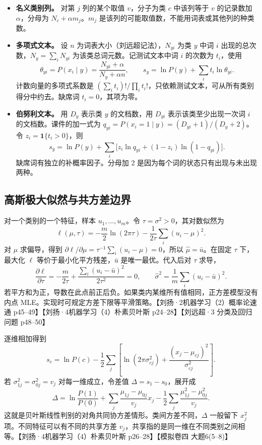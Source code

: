 \documentclass[UTF8,a4paper,zihao=-4,fontset=fandol]{ctexrep}
\begin{document}
\begin{itemize}
\item \textbf{名义类别列。} 对第 $j$ 列的某个取值 $v$，分子为类 $c$ 中该列等于 $v$ 的记录数加 $\alpha$，分母为 $N_c+\alpha m_j$。$m_j$ 是该列的可能取值数，不能用词表或其他列的种类数。
\item \textbf{多项式文本。} 设 $n$ 为词表大小（刘远超记法），$N_{yi}$ 为类 $y$ 中词 $i$ 出现的总次数，$N_y=\sum_iN_{yi}$ 为该类总词元数。记测试文本中词 $i$ 的次数为 $t_i$，使用
\[
 \theta_{yi}=P(x_i\mid y)=\frac{N_{yi}+\alpha}{N_y+\alpha n},
 \qquad
 s_y=\ln P(y)+\sum_i t_i\ln\theta_{yi}.
\]
计数向量的多项式系数是 $(\sum_it_i)!/\prod_i t_i!$，只依赖测试文本，可从所有类别得分中约去。缺席词 $t_i=0$，其项为零。
\item \textbf{伯努利文本。} 用 $D_y$ 表示类 $y$ 的文档数，用 $D_{yi}$ 表示该类至少出现一次词 $i$ 的文档数。课件的加一式为 $q_{yi}=P(x_i=1\mid y)=(D_{yi}+1)/(D_y+2)$。令 $z_i=\mathbf1\{t_i>0\}$，则
\[
 s_y=\ln P(y)+\sum_i\bigl[z_i\ln q_{yi}+(1-z_i)\ln(1-q_{yi})\bigr].
\]
缺席词有独立的补概率因子。分母加 2 是因为每个词的状态只有出现与未出现两种。
\end{itemize}

\subsection*{高斯极大似然与共方差边界}
对一个类别的一个特征，样本 $u_1,\ldots,u_m$。令 $\tau=\sigma^2>0$，其对数似然为
\[
 \ell(\mu,\tau)=-\frac m2\ln(2\pi\tau)
                -\frac1{2\tau}\sum_i(u_i-\mu)^2.
\]
对 $\mu$ 求偏导，得到 $\partial\ell/\partial\mu=\tau^{-1}\sum_i(u_i-\mu)=0$，所以 $\widehat\mu=\bar u$。在固定 $\tau$ 下，最大化 $\ell$ 等价于最小化平方残差，$\bar u$ 是唯一最优。代入后对 $\tau$ 求导，
\[
 \frac{\partial\ell}{\partial\tau}=
 -\frac{m}{2\tau}+
 \frac{\sum_i(u_i-\bar u)^2}{2\tau^2}=0,
 \qquad
 \widehat\sigma^2=\frac1m\sum_i(u_i-\bar u)^2.
\]
若平方和为正，导数在此点前正后负。如果类内某维所有值相同，正方差模型没有内点 MLE。实现时可规定方差下限等平滑策略。【刘扬·2机器学习（2）概率论速通 p45–49】【刘扬·4机器学习（4）朴素贝叶斯 p24–28】【刘远超·3 分类及回归问题 p48–50】

逐维相加得到
\[
 s_c=\ln P(c)-\frac12\sum_j
 \left[\ln(2\pi\sigma_{cj}^2)+\frac{(x_j-\mu_{cj})^2}{\sigma_{cj}^2}\right].
\]
若 $\sigma_{1j}^2=\sigma_{0j}^2=v_j$ 对每一维成立，令差值 $\Delta=s_1-s_0$，展开成
\[
 \Delta=\ln\frac{P(1)}{P(0)}
 +\sum_j\frac{\mu_{1j}-\mu_{0j}}{v_j}x_j
 -\frac12\sum_j\frac{\mu_{1j}^2-\mu_{0j}^2}{v_j}.
\]
这就是贝叶斯线性判别的对角共同协方差情形。类间方差不同，$\Delta$ 一般留下 $x_j^2$ 项。不同特征可以有不同的共享方差 $v_j$，共享指的是同一维在不同类别之间相等。【刘扬·4机器学习（4）朴素贝叶斯 p26–28】【模拟卷四 大题6(5–8)】
\end{document}
